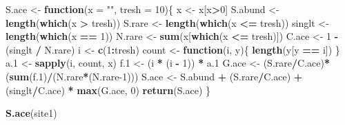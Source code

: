 \documentclass[
]{article}
\newenvironment{Shaded}{\begin{snugshade}}{\end{snugshade}}
\newcommand{\AttributeTok}[1]{\textcolor[rgb]{0.13,0.29,0.53}{#1}}
\newcommand{\ControlFlowTok}[1]{\textcolor[rgb]{0.13,0.29,0.53}{\textbf{#1}}}
\newcommand{\DecValTok}[1]{\textcolor[rgb]{0.00,0.00,0.81}{#1}}
\newcommand{\FloatTok}[1]{\textcolor[rgb]{0.00,0.00,0.81}{#1}}
\newcommand{\FunctionTok}[1]{\textcolor[rgb]{0.13,0.29,0.53}{\textbf{#1}}}
\newcommand{\NormalTok}[1]{#1}
\newcommand{\OtherTok}[1]{\textcolor[rgb]{0.56,0.35,0.01}{#1}}
\newcommand{\SpecialCharTok}[1]{\textcolor[rgb]{0.81,0.36,0.00}{\textbf{#1}}}
\newcommand{\StringTok}[1]{\textcolor[rgb]{0.31,0.60,0.02}{#1}}
\begin{document}
\begin{Shaded}
\begin{Highlighting}[]
\NormalTok{S.ace }\OtherTok{\textless{}{-}} \ControlFlowTok{function}\NormalTok{(}\AttributeTok{x =} \StringTok{""}\NormalTok{, }\AttributeTok{tresh =} \DecValTok{10}\NormalTok{)\{}
\NormalTok{  x }\OtherTok{\textless{}{-}}\NormalTok{ x[x}\SpecialCharTok{\textgreater{}}\DecValTok{0}\NormalTok{]}
\NormalTok{  S.abund }\OtherTok{\textless{}{-}} \FunctionTok{length}\NormalTok{(}\FunctionTok{which}\NormalTok{(x }\SpecialCharTok{\textgreater{}}\NormalTok{ tresh))}
\NormalTok{  S.rare }\OtherTok{\textless{}{-}} \FunctionTok{length}\NormalTok{(}\FunctionTok{which}\NormalTok{(x }\SpecialCharTok{\textless{}=}\NormalTok{ tresh))}
\NormalTok{  singlt }\OtherTok{\textless{}{-}} \FunctionTok{length}\NormalTok{(}\FunctionTok{which}\NormalTok{(x }\SpecialCharTok{==} \DecValTok{1}\NormalTok{))}
\NormalTok{  N.rare }\OtherTok{\textless{}{-}} \FunctionTok{sum}\NormalTok{(x[}\FunctionTok{which}\NormalTok{(x }\SpecialCharTok{\textless{}=}\NormalTok{ tresh)])}
\NormalTok{  C.ace }\OtherTok{\textless{}{-}} \DecValTok{1} \SpecialCharTok{{-}}\NormalTok{ (singlt }\SpecialCharTok{/}\NormalTok{ N.rare)}
\NormalTok{  i }\OtherTok{\textless{}{-}} \FunctionTok{c}\NormalTok{(}\DecValTok{1}\SpecialCharTok{:}\NormalTok{tresh)}
\NormalTok{  count }\OtherTok{\textless{}{-}} \ControlFlowTok{function}\NormalTok{(i, y)\{}
    \FunctionTok{length}\NormalTok{(y[y }\SpecialCharTok{==}\NormalTok{ i])}
\NormalTok{  \}}
\NormalTok{  a}\FloatTok{.1} \OtherTok{\textless{}{-}} \FunctionTok{sapply}\NormalTok{(i, count, x)}
\NormalTok{  f}\FloatTok{.1} \OtherTok{\textless{}{-}}\NormalTok{ (i }\SpecialCharTok{*}\NormalTok{ (i }\SpecialCharTok{{-}} \DecValTok{1}\NormalTok{)) }\SpecialCharTok{*}\NormalTok{ a}\FloatTok{.1}
\NormalTok{  G.ace }\OtherTok{\textless{}{-}}\NormalTok{ (S.rare}\SpecialCharTok{/}\NormalTok{C.ace)}\SpecialCharTok{*}\NormalTok{(}\FunctionTok{sum}\NormalTok{(f}\FloatTok{.1}\NormalTok{)}\SpecialCharTok{/}\NormalTok{(N.rare}\SpecialCharTok{*}\NormalTok{(N.rare}\DecValTok{{-}1}\NormalTok{)))}
\NormalTok{  S.ace }\OtherTok{\textless{}{-}}\NormalTok{ S.abund }\SpecialCharTok{+}\NormalTok{ (S.rare}\SpecialCharTok{/}\NormalTok{C.ace) }\SpecialCharTok{+}\NormalTok{ (singlt}\SpecialCharTok{/}\NormalTok{C.ace) }\SpecialCharTok{*} \FunctionTok{max}\NormalTok{(G.ace, }\DecValTok{0}\NormalTok{)}
  \FunctionTok{return}\NormalTok{(S.ace)}
\NormalTok{\}}


\FunctionTok{S.ace}\NormalTok{(site1)}
\end{Highlighting}
\end{Shaded}
\end{document}
